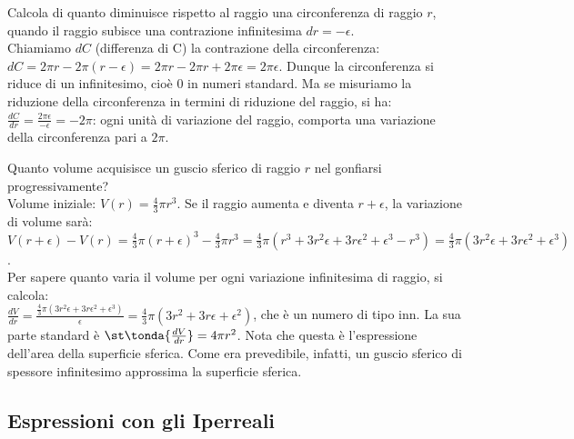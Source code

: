 \begin{esempio}
Calcola di quanto diminuisce rispetto al raggio una circonferenza di raggio 
$r$,
quando il raggio subisce una contrazione infinitesima $dr=-\epsilon$.\\
Chiamiamo $dC$ (differenza di C) la contrazione della circonferenza:
\(dC=2\pi r-2\pi (r-\epsilon)=2\pi r-2\pi r+2\pi \epsilon= 2\pi \epsilon\).
Dunque la circonferenza si riduce di un infinitesimo, cioè $0$ in numeri 
standard.
Ma se misuriamo la riduzione della circonferenza in termini
di riduzione del raggio, si ha:
\(\frac{dC}{dr}=\frac{2\pi \epsilon}{-\epsilon}=-2\pi\): ogni unità di 
variazione 
del raggio, comporta una variazione della circonferenza pari a $2\pi$.
\end{esempio}

\begin{esempio}
Quanto volume acquisisce un guscio sferico di raggio $r$ nel gonfiarsi
progressivamente?\\
Volume iniziale: $V(r)=\frac{4}{3}\pi r^3$. Se il raggio aumenta e diventa 
$r+\epsilon$, 
la variazione di volume sarà:\\
\(V(r+\epsilon)-V(r)=\frac{4}{3}\pi (r+\epsilon)^3-\frac{4}{3}\pi r^3=
\frac{4}{3}\pi (r^3+3r^2\epsilon+3r\epsilon^2+\epsilon^3-r^3)=
\frac{4}{3}\pi (3r^2\epsilon+3r\epsilon^2+\epsilon^3)\).\\
Per sapere quanto varia il volume per ogni variazione infinitesima di raggio, 
si calcola:\\
\(\frac{dV}{dr}=\frac{\frac{4}{3}\pi 
(3r^2\epsilon+3r\epsilon^2+\epsilon^3)}{\epsilon}=
\frac{4}{3}\pi (3r^2+3r\epsilon+\epsilon^2)\), che è un numero di tipo inn.
La sua parte standard è $\st\tonda{\frac{dV}{dr}}=4\pi r^2$. Nota che questa
è l'espressione dell'area della superficie sferica. Come era prevedibile, 
infatti, 
un guscio sferico di spessore infinitesimo approssima la superficie sferica.
\end{esempio}

\subsection{Espressioni con gli Iperreali}
\label{subsec:insnum_espressioni}

